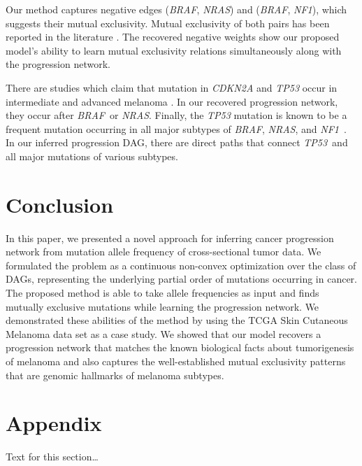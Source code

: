 \documentclass{bmcart}
\def\br{\textit{BRAF}}
\def\nr{\textit{NRAS}}
\def\tp{\textit{TP53}}
\def\nf{\textit{NF1}}
\begin{document}
Our method captures negative edges (\br, \nr) and (\br, \nf), which suggests their mutual exclusivity. Mutual exclusivity of both pairs has been reported in the literature \cite{davies2002mutations, davies2010analysis}. The recovered negative weights show our proposed model's ability to learn mutual exclusivity relations simultaneously along with the progression network. 

There are studies which claim that mutation in \textit{CDKN2A} and \textit{TP53} occur in intermediate and advanced melanoma \cite{shain2015genetic, davis2018melanoma}. In our recovered progression network, they occur after \br\ or \nr. Finally, the \textit{TP53} mutation is known to be a frequent mutation occurring in all major subtypes of \br, \nr, and \nf\ \cite{davis2018melanoma}. In our inferred progression DAG, there are direct paths that connect \tp\ and all major mutations of various subtypes. 

\section{Conclusion}

In this paper, we presented a novel approach for inferring cancer progression network from mutation allele frequency of cross-sectional tumor data. We formulated the problem as a continuous non-convex optimization over the class of DAGs, representing the underlying partial order of mutations occurring in cancer. The proposed method is able to take allele frequencies as input and finds mutually exclusive mutations while learning the progression network. We demonstrated these abilities of the method by using the TCGA Skin Cutaneous Melanoma data set as a case study. We showed that our model recovers a progression network that matches the known biological facts about tumorigenesis of melanoma and also captures the well-established mutual exclusivity patterns that are genomic hallmarks of melanoma subtypes.




\section*{Appendix}

Text for this section\ldots

\end{document}
